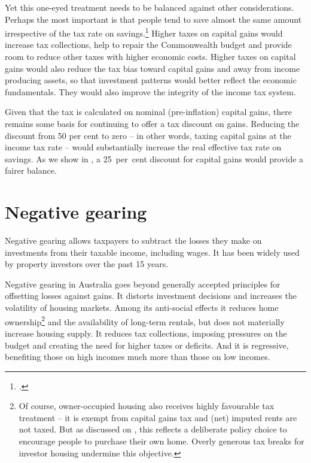 Yet this one-eyed treatment needs to be balanced against other considerations. Perhaps the most important is that people tend to save almost the same amount irrespective of the tax rate on savings.\footcite[][21]{Ingles2015} Higher taxes on capital gains would increase tax collections, help to repair the Commonwealth budget and provide room to reduce other taxes with higher economic costs. Higher taxes on capital gains would also reduce the tax bias toward capital gains and away from income producing assets, so that investment patterns would better reflect the economic fundamentals. They would also improve the integrity of the income tax system. 

Given that the tax is calculated on nominal (pre-inflation) capital gains, there remains some basis for continuing to offer a tax discount on gains. Reducing the discount from 50 per cent to zero -- in other words, taxing capital gains at the income tax rate – would substantially increase the real effective tax rate on savings. As we show in , a 25~per~cent discount for capital gains would provide a fairer balance.

\chapter{Negative gearing}
Negative gearing allows taxpayers to subtract the losses they make on investments from their taxable income, including wages. It has been widely used by property investors over the past 15 years. 

Negative gearing in Australia goes beyond generally accepted principles for offsetting losses against gains. It distorts investment decisions and increases the volatility of housing markets. Among its anti-social effects it reduces home ownership\footnote{Of course, owner-occupied housing also receives highly favourable tax treatment – it is exempt from capital gains tax and (net) imputed rents are not taxed. But as discussed on , this reflects a deliberate policy choice to encourage people to purchase their own home. Overly generous tax breaks for investor housing undermine this objective.} and the availability of long-term rentals, but does not materially increase housing supply. It reduces tax collections, imposing pressures on the budget and creating the need for higher taxes or deficits. And it is regressive, benefiting those on high incomes much more than those on low incomes.

